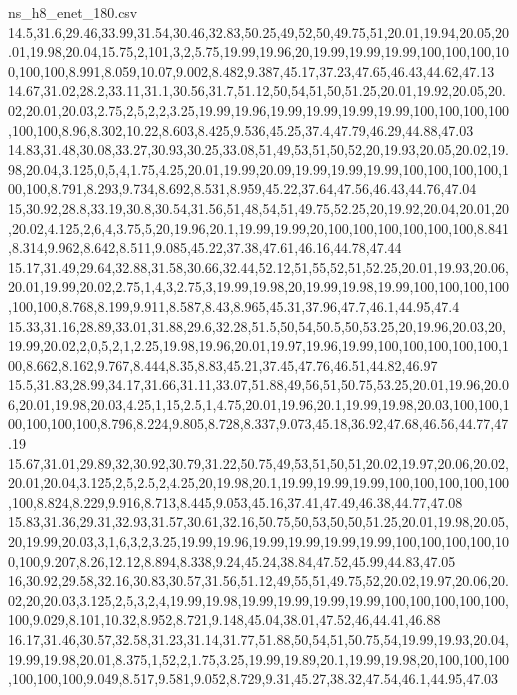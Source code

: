 \begin{filecontents*}[overwrite]{ns_h8_enet_180.csv}
14.5,31.6,29.46,33.99,31.54,30.46,32.83,50.25,49,52,50,49.75,51,20.01,19.94,20.05,20.01,19.98,20.04,15.75,2,101,3,2,5.75,19.99,19.96,20,19.99,19.99,19.99,100,100,100,100,100,100,8.991,8.059,10.07,9.002,8.482,9.387,45.17,37.23,47.65,46.43,44.62,47.13
14.67,31.02,28.2,33.11,31.1,30.56,31.7,51.12,50,54,51,50,51.25,20.01,19.92,20.05,20.02,20.01,20.03,2.75,2,5,2,2,3.25,19.99,19.96,19.99,19.99,19.99,19.99,100,100,100,100,100,100,8.96,8.302,10.22,8.603,8.425,9.536,45.25,37.4,47.79,46.29,44.88,47.03
14.83,31.48,30.08,33.27,30.93,30.25,33.08,51,49,53,51,50,52,20,19.93,20.05,20.02,19.98,20.04,3.125,0,5,4,1.75,4.25,20.01,19.99,20.09,19.99,19.99,19.99,100,100,100,100,100,100,8.791,8.293,9.734,8.692,8.531,8.959,45.22,37.64,47.56,46.43,44.76,47.04
15,30.92,28.8,33.19,30.8,30.54,31.56,51,48,54,51,49.75,52.25,20,19.92,20.04,20.01,20,20.02,4.125,2,6,4,3.75,5,20,19.96,20.1,19.99,19.99,20,100,100,100,100,100,100,8.841,8.314,9.962,8.642,8.511,9.085,45.22,37.38,47.61,46.16,44.78,47.44
15.17,31.49,29.64,32.88,31.58,30.66,32.44,52.12,51,55,52,51,52.25,20.01,19.93,20.06,20.01,19.99,20.02,2.75,1,4,3,2.75,3,19.99,19.98,20,19.99,19.98,19.99,100,100,100,100,100,100,8.768,8.199,9.911,8.587,8.43,8.965,45.31,37.96,47.7,46.1,44.95,47.4
15.33,31.16,28.89,33.01,31.88,29.6,32.28,51.5,50,54,50.5,50,53.25,20,19.96,20.03,20,19.99,20.02,2,0,5,2,1,2.25,19.98,19.96,20.01,19.97,19.96,19.99,100,100,100,100,100,100,8.662,8.162,9.767,8.444,8.35,8.83,45.21,37.45,47.76,46.51,44.82,46.97
15.5,31.83,28.99,34.17,31.66,31.11,33.07,51.88,49,56,51,50.75,53.25,20.01,19.96,20.06,20.01,19.98,20.03,4.25,1,15,2.5,1,4.75,20.01,19.96,20.1,19.99,19.98,20.03,100,100,100,100,100,100,8.796,8.224,9.805,8.728,8.337,9.073,45.18,36.92,47.68,46.56,44.77,47.19
15.67,31.01,29.89,32,30.92,30.79,31.22,50.75,49,53,51,50,51,20.02,19.97,20.06,20.02,20.01,20.04,3.125,2,5,2.5,2,4.25,20,19.98,20.1,19.99,19.99,19.99,100,100,100,100,100,100,8.824,8.229,9.916,8.713,8.445,9.053,45.16,37.41,47.49,46.38,44.77,47.08
15.83,31.36,29.31,32.93,31.57,30.61,32.16,50.75,50,53,50,50,51.25,20.01,19.98,20.05,20,19.99,20.03,3,1,6,3,2,3.25,19.99,19.96,19.99,19.99,19.99,19.99,100,100,100,100,100,100,9.207,8.26,12.12,8.894,8.338,9.24,45.24,38.84,47.52,45.99,44.83,47.05
16,30.92,29.58,32.16,30.83,30.57,31.56,51.12,49,55,51,49.75,52,20.02,19.97,20.06,20.02,20,20.03,3.125,2,5,3,2,4,19.99,19.98,19.99,19.99,19.99,19.99,100,100,100,100,100,100,9.029,8.101,10.32,8.952,8.721,9.148,45.04,38.01,47.52,46,44.41,46.88
16.17,31.46,30.57,32.58,31.23,31.14,31.77,51.88,50,54,51,50.75,54,19.99,19.93,20.04,19.99,19.98,20.01,8.375,1,52,2,1.75,3.25,19.99,19.89,20.1,19.99,19.98,20,100,100,100,100,100,100,9.049,8.517,9.581,9.052,8.729,9.31,45.27,38.32,47.54,46.1,44.95,47.03

\end{filecontents*}
